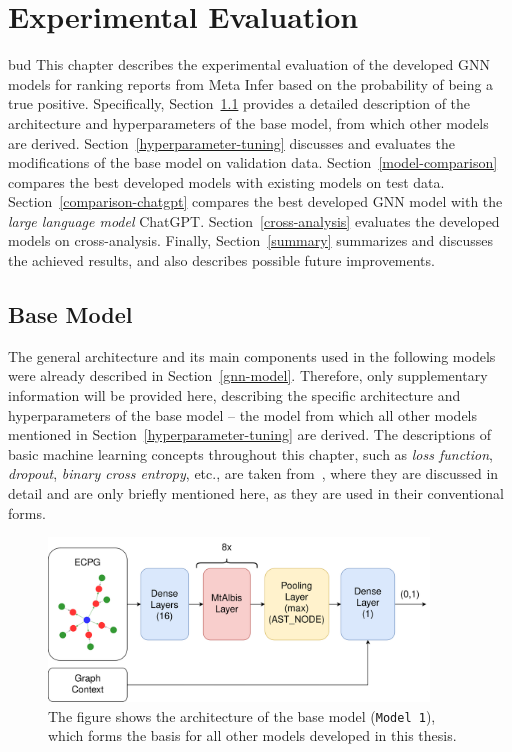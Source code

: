 \chapter{Experimental Evaluation}
\label{experiments}bud
This chapter describes the experimental evaluation of the developed GNN models for ranking reports from Meta Infer based on the probability of being a true positive. Specifically, Section~\ref{base-model} provides a detailed description of the architecture and hyperparameters of the base model, from which other models are derived. Section~\ref{hyperparameter-tuning} discusses and evaluates the modifications of the base model on validation data. Section~\ref{model-comparison} compares the best developed models with existing models on test data. Section~\ref{comparison-chatgpt} compares the best developed GNN model with the \textit{large language model} ChatGPT. Section~\ref{cross-analysis} evaluates the developed models on cross-analysis. Finally, Section~\ref{summary} summarizes and discusses the achieved results, and also describes possible future improvements.


\section{Base Model}
\label{base-model}
The general architecture and its main components used in the following models were already described in Section~\ref{gnn-model}. Therefore, only supplementary information will be provided here, describing the specific architecture and hyperparameters of the base model -- the model from which all other models mentioned in Section~\ref{hyperparameter-tuning} are derived. The descriptions of basic machine learning concepts throughout this chapter, such as \textit{loss function}, \textit{dropout}, \textit{binary cross entropy}, etc., are taken from~\cite{book-deep-learning}, where they are discussed in detail and are only briefly mentioned here, as they are used in their conventional forms.

\begin{figure}[t]
    \centering
    \includegraphics[width=0.9\textwidth]{figures/base-model.png}
    \caption{The figure shows the architecture of the base model (\texttt{Model 1}), which forms the basis for all other models developed in this thesis.}
    \label{figure:base-model}
\end{figure}

